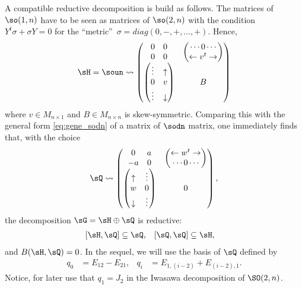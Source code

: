 A compatible reductive decomposition is build as follows. The matrices of $\so(1,n)$ have to be seen as matrices of $\so(2,n)$ with the condition $Y^t\sigma+\sigma Y=0$ for the  ``metric''\ $\sigma=diag(0,-,+,\ldots,+)$. Hence,
\begin{equation}		\label{eq:gene_H}
\sH=\soun\leadsto
  \begin{pmatrix}
     \begin{matrix}
       0&0\\
       0&0
     \end{matrix}
                       &  \begin{pmatrix}
		             \cdots 0\cdots\\
			    \leftarrow v^t\rightarrow
                          \end{pmatrix}\\
    \begin{pmatrix}	  
       \vdots & \uparrow\\
         0    & v \\
       \vdots & \downarrow
    \end{pmatrix} &  B
  \end{pmatrix}
\end{equation}
where  $v\in M_{n\times 1}$ and $B\in M_{n\times n}$ is skew-symmetric. Comparing this with the general form \eqref{eq:gene_sodn} of a matrix of $\sodn$ matrix, one immediately finds that, with the choice
\begin{equation}\label{EqGeneRedQ}
\sQ\leadsto
 \begin{pmatrix}
     \begin{matrix}
       0&a\\
       -a&0
     \end{matrix}
                       &  \begin{pmatrix}		             
			  \leftarrow w^t\rightarrow \\
			     \cdots 0\cdots\\
                          \end{pmatrix}\\
    \begin{pmatrix}	  
      \uparrow   & \vdots\\
          w      &  0\\
      \downarrow & \vdots 
    \end{pmatrix} & 0
  \end{pmatrix},
 \end{equation}
the decomposition $\sG=\sH\oplus\sQ$ is reductive:
\begin{align}		\label{EqDefRedHQ}
  [\sH,\sQ]&\subseteq\sQ,
 &[\sQ,\sQ]&\subseteq\sH,
\end{align}
and $B(\sH,\sQ)=0$. In the sequel, we will use the basis of $\sQ$ defined by 
\begin{align}		\label{EqDefBaseqi}
  q_0&=E_{12}-E_{21}, &q_i&=E_{1,(i-2)}+E_{(i-2),1}.
\end{align}
Notice, for later use that $q_1=J_2$ in the Iwasawa decomposition of $\SO(2,n)$.
